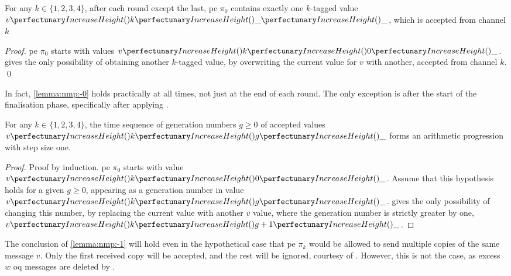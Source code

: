 \begin{lemma}\label{lemma:nmp:-0}
    For any $k \in \{ 1, 2, 3, 4 \}$, after each round except the last,
    \gls{pe} $\pi_0$ contains exactly one $k$-tagged value $\cpvv{k}{\cpdiscard}{\cpdiscard}$, 
    which is accepted from channel $k$ 
\end{lemma}

\begin{proof}
    \Gls{pe} $\pi_0$ starts with values $\cpvv{k}{0}{\cpdiscard}$.
     gives the only possibility of obtaining another $k$-tagged value, by overwriting the current value for $v$ with another, accepted from channel $k$. \qed
\end{proof}

\begin{remark}
    In fact, \cref{lemma:nmp:-0} holds practically at all times, not just at the end of each round.  The only exception is after the start of the finalisation phase, specifically after applying .
\end{remark}

\begin{lemma}\label{lemma:nmp:-1}
    For any $k \in \{ 1, 2, 3, 4 \}$, the time sequence of generation numbers $g \geq 0$ of accepted values $\cpvv{k}{g}{\cpdiscard}$ forms an arithmetic progression with step size one.
\end{lemma}

\begin{proof}
    Proof by induction. \Gls{pe} $\pi_0$ starts with value $\cpvv{k}{0}{\cpdiscard}$.
    Assume that this hypothesis holds for a given $g \geq 0$, appearing as a generation number in value $\cpvv{k}{g}{\cpdiscard}$.  gives the only possibility of changing this number, by replacing the current value with another $v$ value, where the generation number is strictly greater by one, 
    $\cpvv{k}{g+1}{\cpdiscard}$.
\end{proof}

\begin{remark}\label{remark:nmp:-1}
The conclusion of \cref{lemma:nmp:-1} will hold even in the hypothetical case that \gls{pe} $\pi_k$ would be allowed to send multiple copies of the same message $v$. 
Only the first received copy will be accepted, and the rest will be ignored,
courtesy of . However, this is not the case, as excess \(w\) \gls{oq} messages are deleted by . 
\end{remark}

